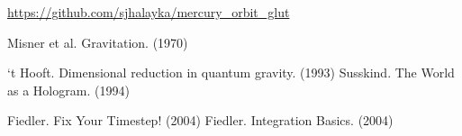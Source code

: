 \documentclass[12pt]{article}
\begin{document}
\url{https://github.com/sjhalayka/mercury_orbit_glut}











\begin{thebibliography}{9}

 Misner et al. Gravitation. (1970)

 `t Hooft. Dimensional reduction in quantum gravity. (1993)
 Susskind. The World as a Hologram. (1994)

 Fiedler. Fix Your Timestep! (2004)
 Fiedler. Integration Basics. (2004)







\end{thebibliography}
\end{document}
